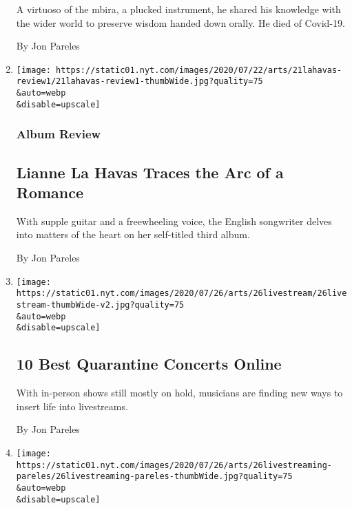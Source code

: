\begin{enumerate}
  A virtuoso of the mbira, a plucked instrument, he shared his knowledge
  with the wider world to preserve wisdom handed down orally. He died of
  Covid-19.

  By Jon Pareles
\item
  \href{/2020/07/21/arts/music/lianne-la-havas-review.html}{}

  \texttt{[image: https://static01.nyt.com/images/2020/07/22/arts/21lahavas-review1/21lahavas-review1-thumbWide.jpg?quality=75\\\&auto=webp\\\&disable=upscale]}

  \hypertarget{album-review}{%
  \subsubsection{Album Review}\label{album-review}}

  \hypertarget{lianne-la-havas-traces-the-arc-of-a-romance}{%
  \subsection{Lianne La Havas Traces the Arc of a
  Romance}\label{lianne-la-havas-traces-the-arc-of-a-romance}}

  With supple guitar and a freewheeling voice, the English songwriter
  delves into matters of the heart on her self-titled third album.

  By Jon Pareles
\item
  \href{/2020/07/21/arts/music/best-quarantine-concerts-livestream.html}{}

  \texttt{[image: https://static01.nyt.com/images/2020/07/26/arts/26livestream/26livestream-thumbWide-v2.jpg?quality=75\\\&auto=webp\\\&disable=upscale]}

  \hypertarget{10-best-quarantine-concerts-online}{%
  \subsection{10 Best Quarantine Concerts
  Online}\label{10-best-quarantine-concerts-online}}

  With in-person shows still mostly on hold, musicians are finding new
  ways to insert life into livestreams.

  By Jon Pareles
\item
  \href{/2020/07/21/arts/music/livestreams-intimacy.html}{}

  \texttt{[image: https://static01.nyt.com/images/2020/07/26/arts/26livestreaming-pareles/26livestreaming-pareles-thumbWide.jpg?quality=75\\\&auto=webp\\\&disable=upscale]}


\end{enumerate}
